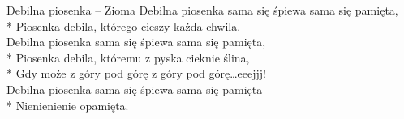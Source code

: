 \begin{piosenka_dluga}[-10mm]{Debilna piosenka -- Zioma}
Debilna piosenka sama się śpiewa sama się pamięta, \\*
Piosenka debila, którego cieszy każda chwila. \\[\zwrotkaspace]

Debilna piosenka sama się śpiewa sama się pamięta, \\*
Piosenka debila, któremu z pyska cieknie ślina, \\*
Gdy może z góry pod górę z góry pod górę\ldots eeejjj! \\[\zwrotkaspace]

Debilna piosenka sama się śpiewa sama się pamięta \\*
Nienienienie opamięta. \\

\end{piosenka_dluga}
$\phantom{a}$\\[1cm]
  